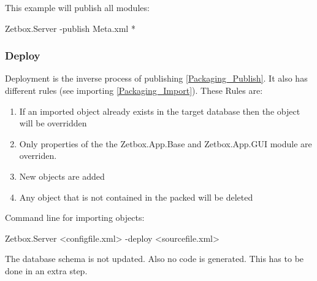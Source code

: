 This example will publish all modules:
\begin{CS}
Zetbox.Server -publish Meta.xml *
\end{CS}


\subsubsection{\label{Packaging_Deploy}Deploy}

Deployment is the inverse process of publishing \ref{Packaging_Publish}. It also has different rules (see importing \ref{Packaging_Import}).
These Rules are:

\begin{enumerate}
 \item If an imported object already exists in the target database then the object will be overridden
 \item Only properties of the the Zetbox.App.Base and Zetbox.App.GUI module are overriden.
 \item New objects are added
 \item Any object that is not contained in the packed will be deleted
\end{enumerate}

Command line for importing objects:
\begin{CS}
Zetbox.Server <configfile.xml> -deploy <sourcefile.xml>
\end{CS}

The database schema is not updated. Also no code is generated. This has to be done in an extra step.


